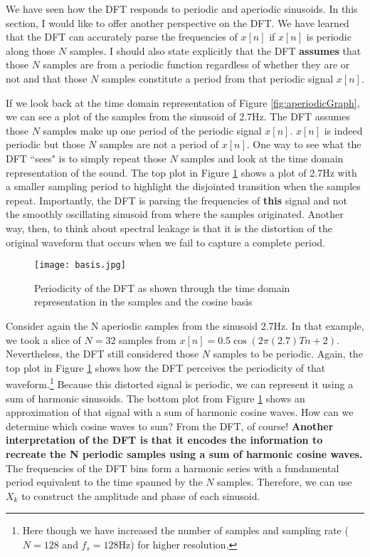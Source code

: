 We have seen how the DFT responds to periodic and aperiodic sinusoids.  In this section, I would like to offer 
another perspective on the DFT.  We have learned that the DFT can accurately parse the frequencies of $x[n]$ if
$x[n]$ is periodic along those $N$ samples.  I should also state explicitly that the DFT \textbf{assumes} that
those $N$ samples are from a periodic function regardless of whether they are or not and that those $N$ samples
constitute a period from that periodic signal $x[n]$.  

If we look back at the time
domain representation of Figure \ref{fig:aperiodicGraph}, we can see a plot of the samples from the sinusoid of
2.7Hz.  The DFT assumes those $N$ samples make up one period of the periodic signal $x[n]$.  $x[n]$
is indeed periodic but those $N$ samples are not a period of $x[n]$.  One way to see what the DFT ``sees" is to
simply repeat those $N$ samples and look at the time domain representation of the sound.  The top plot in Figure
\ref{fig:basis} shows a plot of 2.7Hz with a smaller sampling period to highlight the disjointed transition when the samples
repeat.  Importantly, the DFT is parsing the frequencies of \textbf{this} signal and not the smoothly oscillating sinusoid 
from where the samples originated.  Another way, then,
to think about spectral leakage is that it is the distortion of the original waveform that occurs when we fail
to capture a complete period.

\begin{figure}[h]
	\caption{Periodicity of the DFT as shown through the time domain representation in the samples and the cosine basis}
	\label{fig:basis}
	\begin{center}
		\texttt{[image: basis.jpg]}
	\end{center}
\end{figure}

Consider again the N aperiodic samples from the sinusoid 2.7Hz. In that example,
we took a slice of $N = 32$ samples from $x[n] = 0.5\cos(2\pi (2.7)Tn + 2)$.  Nevertheless, the DFT still considered those $N$ samples to be periodic.  Again, the top plot in Figure \ref{fig:basis} shows how the DFT perceives the periodicity of that waveform.\footnote{
	Here though we have increased the number of samples and sampling rate 
	($N = 128$ and $f_s = 128$Hz) for higher resolution.
}
Because this distorted signal is periodic, we can represent it using a sum of harmonic sinusoids.  The bottom plot from Figure \ref{fig:basis} shows an approximation of that signal with a sum of harmonic cosine waves.  
How can we determine which cosine waves to sum?  From the DFT, of course!  
\textbf{Another interpretation of the
DFT is that it encodes the information to recreate the N periodic samples using a sum of harmonic cosine waves.}  
The frequencies
of the DFT bins form a harmonic series with a fundamental period equivalent to the time spanned by the $N$ samples.
Therefore, we can use $X_k$ to construct the amplitude and phase of each sinusoid.

